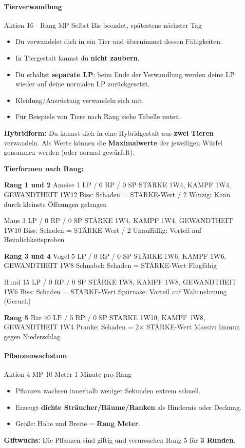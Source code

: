 \paragraph*{Tierverwandlung}
\spellcard
{}
{Aktion}
{16 - Rang MP}
{Selbst}
{Bis beendet, spätestens nächster Tag}
{
	\begin{itemize}
		\item Du verwandelst dich in ein Tier und übernimmst dessen Fähigkeiten.
		\item In Tiergestalt kannst du \textbf{nicht zaubern}.
		\item Du erhältst \textbf{separate LP}; beim Ende der Verwandlung werden deine LP wieder auf deine normalen LP zurückgesetzt.
		\item Kleidung/Ausrüstung verwandeln sich mit.
		\item Für Beispiele von Tiere nach Rang siehe Tabelle unten.
	\end{itemize}
	
}
{
	\textbf{Hybridform:} Du kannst dich in eine Hybridgestalt aus \textbf{zwei Tieren} verwandeln.
	Als Werte können die \textbf{Maximalwerte} der jeweiligen Würfel genommen werden (oder normal gewürfelt).
}

\textbf{Tierformen nach Rang:}

\medskip

\textbf{Rang 1 und 2}
\creatureblock
{Ameise}
{1 LP / 0 RP / 0 SP}
{STÄRKE 1W4, KAMPF 1W4, GEWANDTHEIT 1W12}
{Biss: Schaden = STÄRKE-Wert / 2}
{Winzig: Kann durch kleinste Öffnungen gelangen}

\creatureblock
{Maus}
{3 LP / 0 RP / 0 SP}
{STÄRKE 1W4, KAMPF 1W4, GEWANDTHEIT 1W10}
{Biss: Schaden = STÄRKE-Wert / 2}
{Unauffällig: Vorteil auf Heimlichkeitsproben}

\textbf{Rang 3 und 4}
\creatureblock
{Vogel}
{5 LP / 0 RP / 0 SP}
{STÄRKE 1W6, KAMPF 1W6, GEWANDTHEIT 1W8}
{Schnabel: Schaden = STÄRKE-Wert}
{Flugfähig}

\creatureblock
{Hund}
{15 LP / 0 RP / 0 SP}
{STÄRKE 1W8, KAMPF 1W8, GEWANDTHEIT 1W6}
{Biss: Schaden = STÄRKE-Wert}
{Spürnase: Vorteil auf Wahrnehmung (Geruch)}

\textbf{Rang 5}
\creatureblock
{Bär}
{40 LP / 5 RP / 0 SP}
{STÄRKE 1W10, KAMPF 1W8, GEWANDTHEIT 1W4}
{Pranke: Schaden = 2× STÄRKE-Wert}
{Massiv: Immun gegen Niederschlag}


\paragraph*{Pflanzenwachstum}
\spellcard
{}
{Aktion}
{4 MP}
{10 Meter}
{1 Minute pro Rang}
{
	\begin{itemize}
		\item Pflanzen wachsen innerhalb weniger Sekunden extrem schnell.
		\item Erzeugt \textbf{dichte Sträucher/Bäume/Ranken} als Hindernis oder Deckung.
		\item Größe: Höhe und Breite = \textbf{Rang Meter}.
	\end{itemize}
}
{
	\textbf{Giftwuchs:} Die Pflanzen sind giftig und verursachen  Rang 5 für \textbf{3 Runden}.
}

